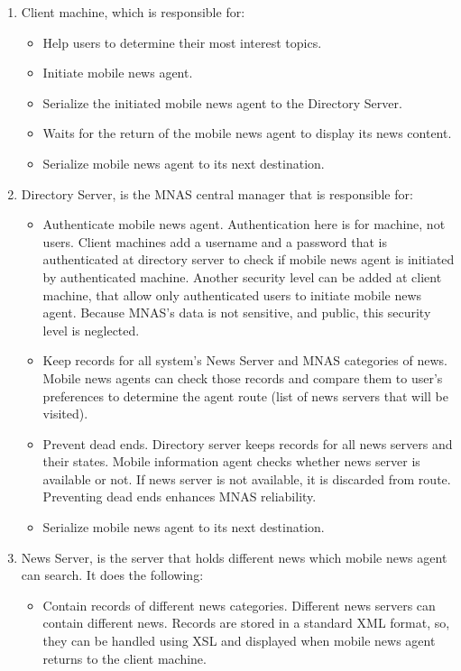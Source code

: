 \documentclass[12pt,a4paper,final,twoside,onecolumn,titlepage]{book}
\begin{document}
\begin{enumerate}
\item Client machine, which is responsible for:
\begin{itemize}
\item Help users to determine their most interest topics.
\item Initiate mobile news agent.
\item Serialize the initiated mobile news agent to the Directory Server. 
\item Waits for the return of the mobile news agent to display its news content.
\item Serialize mobile news agent to its next destination.
\end{itemize}
\item Directory Server, is the \gls{MNAS} central manager that is responsible for:
\begin{itemize}
\item Authenticate mobile news agent. Authentication here is for machine, not users. Client machines add a username and a password that is authenticated at directory server to check if mobile news agent is initiated by authenticated machine. Another security level can be added at client machine, that allow only authenticated users to initiate mobile news agent. Because \gls{MNAS}'s data is not sensitive, and public, this security level is neglected. 
\item Keep records for all system's News Server and \gls{MNAS} categories of news. Mobile news agents can check those records and compare them to user's preferences to determine the agent route (list of news servers that will be visited). 
\item Prevent dead ends. Directory server keeps records for all news servers and their states. Mobile information agent checks whether news server is available or not. If news server is not available, it is discarded from route. Preventing dead ends enhances \gls{MNAS} reliability.
\item Serialize mobile news agent to its next destination.
\end{itemize}
\item News Server, is the server that holds different news which mobile news agent can search. It does the following:
\begin{itemize}
\item Contain records of different news categories. Different news servers can contain different news. Records are stored in a standard \gls{XML} format, so, they can be handled using XSL and displayed when mobile news agent returns to the client machine.  

\end{itemize}
\end{enumerate}
\end{document}
